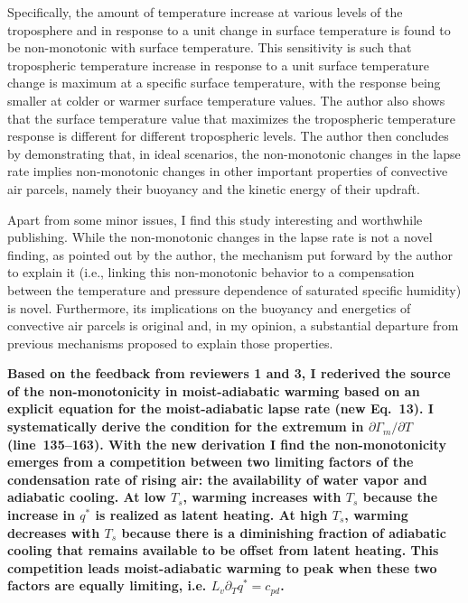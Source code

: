 \documentclass{article}
\begin{document}
Specifically, the amount of temperature increase at various levels of the troposphere and in response to a unit change in surface temperature is found to be non-monotonic with surface temperature. This sensitivity is such that tropospheric temperature increase in response to a unit surface temperature change is maximum at a specific surface temperature, with the response being smaller at colder or warmer surface temperature values. The author also shows that the surface temperature value that maximizes the tropospheric temperature response is different for different tropospheric levels. The author then concludes by demonstrating that, in ideal scenarios, the non-monotonic changes in the lapse rate implies non-monotonic changes in other important properties of convective air parcels, namely their buoyancy and the kinetic energy of their updraft.

Apart from some minor issues, I find this study interesting and worthwhile publishing. While the non-monotonic changes in the lapse rate is not a novel finding, as pointed out by the author, the mechanism put forward by the author to explain it (i.e., linking this non-monotonic behavior to a compensation between the temperature and pressure dependence of saturated specific humidity) is novel. Furthermore, its implications on the buoyancy and energetics of convective air parcels is original and, in my opinion, a substantial departure from previous mechanisms proposed to explain those properties.
\par
\textbf{Based on the feedback from reviewers 1 and 3, I rederived the source of the non-monotonicity in moist-adiabatic warming based on an explicit equation for the moist-adiabatic lapse rate (new Eq.~13). I systematically derive the condition for the extremum in $\partial\Gamma_m/\partial T$ (line~135--163). With the new derivation I find the non-monotonicity emerges from a competition between two limiting factors of the condensation rate of rising air: the availability of water vapor and adiabatic cooling. At low $T_s$, warming increases with $T_s$ because the increase in $q^*$ is realized as latent heating. At high $T_s$, warming decreases with $T_s$ because there is a diminishing fraction of adiabatic cooling that remains available to be offset from latent heating. This competition leads moist-adiabatic warming to peak when these two factors are equally limiting, i.e. $L_v \partial_T q^* = c_{pd}$.}
\par
\end{document}
